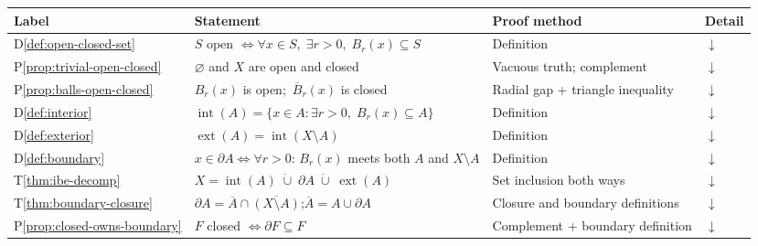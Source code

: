 %


\begin{tcolorbox}[colback=gray!6, colframe=gray!40, arc=2pt,
  left=6pt, right=6pt, top=4pt, bottom=4pt,
  title={\small\textbf{Open Sets, Closed Sets, Interior, Exterior, Boundary --- Quick Reference}},
  fonttitle=\small\bfseries]
\small
\begin{tabular}{l l l l}
\toprule
\textbf{Label} & \textbf{Statement} & \textbf{Proof method} & \textbf{Detail} \\
\midrule
D\ref{def:open-closed-set}
  & $S$ open $\iff \forall x\in S,\;\exists r>0,\;B_r(x)\subseteq S$
  & Definition
  & \hyperref[def:open-closed-set]{$\downarrow$} \\[4pt]
P\ref{prop:trivial-open-closed}
  & $\varnothing$ and $X$ are open and closed
  & Vacuous truth; complement
  & \hyperref[prop:trivial-open-closed]{$\downarrow$} \\[4pt]
P\ref{prop:balls-open-closed}
  & $B_r(x)$ is open;\;\, $\overline{B}_r(x)$ is closed
  & Radial gap + triangle inequality
  & \hyperref[prop:balls-open-closed]{$\downarrow$} \\[4pt]
D\ref{def:interior}
  & $\operatorname{int}(A) = \{x\in A : \exists r>0,\;B_r(x)\subseteq A\}$
  & Definition
  & \hyperref[def:interior]{$\downarrow$} \\[4pt]
D\ref{def:exterior}
  & $\operatorname{ext}(A) = \operatorname{int}(X\setminus A)$
  & Definition
  & \hyperref[def:exterior]{$\downarrow$} \\[4pt]
D\ref{def:boundary}
  & $x\in\partial A \iff \forall r>0$: $B_r(x)$ meets both $A$ and $X\setminus A$
  & Definition
  & \hyperref[def:boundary]{$\downarrow$} \\[4pt]
T\ref{thm:ibe-decomp}
  & $X = \operatorname{int}(A)\;\dot\cup\;\partial A\;\dot\cup\;\operatorname{ext}(A)$
  & Set inclusion both ways
  & \hyperref[thm:ibe-decomp]{$\downarrow$} \\[4pt]
T\ref{thm:boundary-closure}
  & $\partial A = \overline{A}\cap\overline{(X\setminus A)}$;\quad $\overline{A}=A\cup\partial A$
  & Closure and boundary definitions
  & \hyperref[thm:boundary-closure]{$\downarrow$} \\[4pt]
P\ref{prop:closed-owns-boundary}
  & $F$ closed $\iff \partial F \subseteq F$
  & Complement + boundary definition
  & \hyperref[prop:closed-owns-boundary]{$\downarrow$} \\[4pt]
\bottomrule
\end{tabular}
\end{tcolorbox}

